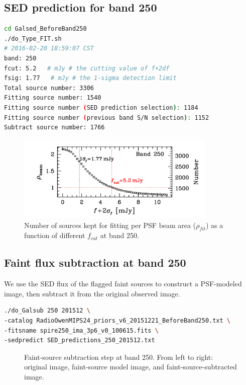 \documentclass[11pt,a4paper]{article}
\begin{document}
\subsection{SED prediction for band 250}
\label{Band250_Galpre}

\begin{lstlisting}[language=bash]
cd Galsed_BeforeBand250
./do_Type_FIT.sh
# 2016-02-20 18:59:07 CST
band: 250
fcut: 5.2   # mJy # the cutting value of f+2df
fsig: 1.77   # mJy # the 1-sigma detection limit
Total source number: 3306
Fitting source number: 1540
Fitting source number (SED prediction selection): 1184
Fitting source number (previous band S/N selection): 1152
Subtract source number: 1766
\end{lstlisting}

\begin{figure}[H]
	\caption{Number of sources kept for fitting per PSF beam area ($\rho_{fit}$) as a function of different $f_{cut}$ at band 250.}
	\includegraphics[width=0.85\textwidth]{plot_cutting_flux_250}
\end{figure}

\subsection{Faint flux subtraction at band 250}
\label{Band250_Galsub}

We use the SED flux of the flagged faint sources to construct a PSF-modeled image, then subtract it from the original observed image. 

\begin{lstlisting}[language=bash]
./do_Galsub 250 201512 \
-catalog RadioOwenMIPS24_priors_v6_20151221_BeforeBand250.txt \
-fitsname spire250_ima_3p6_v0_100615.fits \
-sedpredict SED_predictions_250_201512.txt
\end{lstlisting}

\begin{figure}[H]
	\caption{Faint-source subtraction step at band 250. From left to right: original image, faint-source model image, and faint-source-subtracted image.}
\end{figure}
\end{document}
